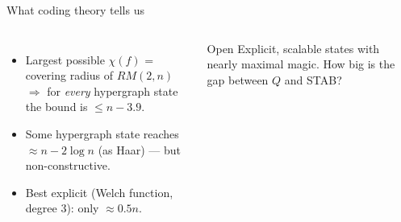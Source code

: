 \begin{frame}{What coding theory tells us}
  \begin{columns}[c]
    \centering
    \small
    \begin{itemize}
      \item Largest possible $\chi(f)$ = covering radius of $RM(2,n)$ \\ $\Rightarrow$ for \emph{every} hypergraph state the bound is $\le n-3.9$.
      \item Some hypergraph state reaches $\approx n-2\log n$ (as Haar) --- but \alert{non-constructive}.
      \item Best explicit (Welch function, degree 3): only $\approx0.5n$.
    \end{itemize}
    \begin{block}{Open}
      \small Explicit, scalable states with nearly maximal magic. How big is the gap between $Q$ and STAB?
    \end{block}
  \end{columns}
\end{frame}
